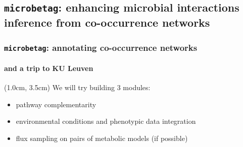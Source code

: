 \documentclass{beamer}
\begin{document}
   \fi

   \begin{darkframes}
      \section{
         \texttt{microbetag}: enhancing microbial interactions inference from co-occurrence networks
      }
   \end{darkframes}

   \begin{frame}

      \frametitle{
         \texttt{microbetag}: annotating co-occurrence networks
      }
      \framesubtitle{and a trip to KU Leuven}

      \begin{textblock*}{5cm}(1.0cm, 3.5cm)
         We will try building 3 modules: 
         
         \begin{itemize}
            \small \item pathway complementarity
            \small \item environmental conditions and phenotypic data integration
            \small \item flux sampling on pairs of metabolic models (if possible)
         \end{itemize}

      \end{textblock*}

\end{frame}
\end{document}
